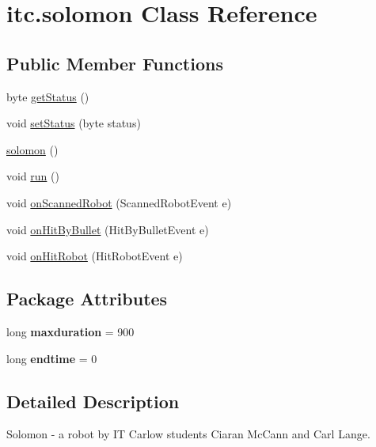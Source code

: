 \hypertarget{classitc_1_1solomon}{
\section{itc.solomon Class Reference}
\label{classitc_1_1solomon}
}
\subsection*{Public Member Functions}
\begin{DoxyCompactItemize}
\item 
byte \hyperlink{classitc_1_1solomon_a1192c7e80d463fb5e0c6e5fc7f8b8944}{getStatus} ()
\item 
void \hyperlink{classitc_1_1solomon_aa16db4d650d1549fd1ae6426af16ea43}{setStatus} (byte status)
\item 
\hyperlink{classitc_1_1solomon_a774791cdf521fc7dc2118a761ccc0681}{solomon} ()
\item 
void \hyperlink{classitc_1_1solomon_a34ceb1ef78c0b0af58b074935e011a72}{run} ()
\item 
void \hyperlink{classitc_1_1solomon_a7b4f3c0da153c43da17a76c433770419}{onScannedRobot} (ScannedRobotEvent e)
\item 
void \hyperlink{classitc_1_1solomon_a61c2a71738163bea55b22c2ddd725117}{onHitByBullet} (HitByBulletEvent e)
\item 
void \hyperlink{classitc_1_1solomon_a5e824f07f03d305450e42a4356a003a5}{onHitRobot} (HitRobotEvent e)
\end{DoxyCompactItemize}
\subsection*{Package Attributes}
\begin{DoxyCompactItemize}
\item 
\hypertarget{classitc_1_1solomon_a6bea1eb6237528e23c4c4341e261c6ba}{
long {\bfseries maxduration} = 900}
\label{classitc_1_1solomon_a6bea1eb6237528e23c4c4341e261c6ba}

\item 
\hypertarget{classitc_1_1solomon_a2584be2758541c9758f9f3ba4ba06f42}{
long {\bfseries endtime} = 0}
\label{classitc_1_1solomon_a2584be2758541c9758f9f3ba4ba06f42}

\end{DoxyCompactItemize}


\subsection{Detailed Description}
Solomon -\/ a robot by IT Carlow students Ciaran McCann and Carl Lange. 

